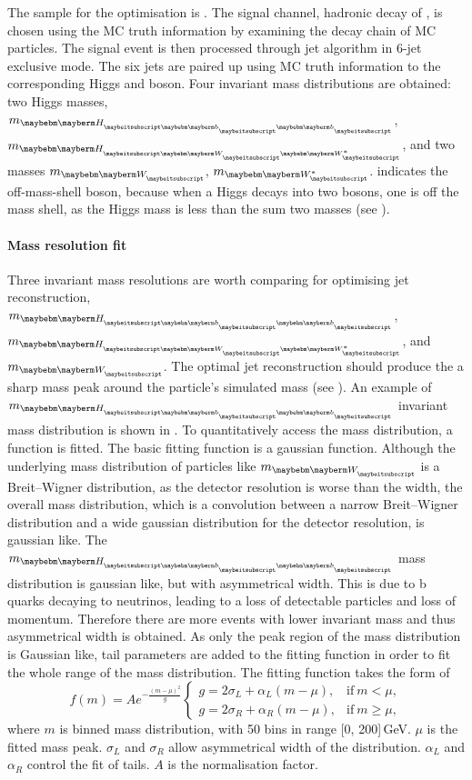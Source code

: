 The sample for the optimisation is \eeToHH. The signal channel, hadronic decay of \eeToHHbbWWHad, is chosen using the MC truth information by  examining the decay chain of MC particles. The signal event is then processed through \kt jet algorithm  in 6-jet exclusive mode. The six jets are paired up using  MC truth information to the corresponding Higgs and \PW boson. Four invariant mass distributions are obtained: two Higgs masses, $m_{\Hbb}$, $m_{\HWW}$, and two \PW masses $m_{\PW}$, $m_{\W*}$. \W* indicates the off-mass-shell \PW boson, because when a Higgs decays into two \PW bosons, one \PW is off the mass shell, as the Higgs mass is less than the sum two \PW masses (see ).

\paragraph{Mass resolution fit}
Three invariant mass resolutions are worth comparing for optimising jet reconstruction,  $m_{\Hbb}$, $m_{\HWW}$, and $m_{\PW}$. The optimal jet reconstruction should produce the a sharp mass peak around the particle's simulated mass (see \Section{}). An example of $m_{\Hbb}$ invariant mass distribution is shown in . To quantitatively access the mass distribution, a function is fitted. The basic fitting function is a gaussian function. Although the underlying mass distribution of particles like $m_{\PW}$ is a Breit–Wigner distribution, as the detector resolution is worse than the \PW width, the overall mass distribution, which is a convolution between a narrow \PW  Breit–Wigner distribution and  a wide gaussian distribution for the detector resolution, is gaussian like. The $m_{\Hbb}$  mass distribution is gaussian like, but with asymmetrical width. This is due to b quarks decaying to neutrinos, leading to a loss of detectable particles and loss of momentum. Therefore there are more events with lower invariant mass and thus asymmetrical width is obtained. As only the peak region of the mass distribution is Gaussian like, tail parameters are added to the fitting function in order to fit the whole range of the mass distribution. The fitting function takes the form of
\begin{equation}
f(m)=A e^{- \frac{(m - \mu)^2}{g}}
\begin{cases}
  g = 2\sigma_L + \alpha_L(m - \mu), & \text{if}\ m < \mu,\\
  g = 2\sigma_R + \alpha_R(m - \mu), & \text{if}\ m \geqslant \mu,
\end{cases}
\end{equation}
where $m$ is binned mass distribution, with 50 bins in range [0, 200]\,GeV. $\mu$ is the fitted mass peak. $\sigma_L$ and $\sigma_R$ allow asymmetrical width of the distribution. $\alpha_L$ and  $\alpha_R$  control the fit of tails.  $A$ is the normalisation factor.


